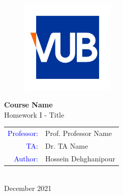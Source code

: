 \documentclass[12pt , a4paper]{article}
\newcommand{\courseName}{Course Name}
\newcommand{\assignmentName}{Homework I - Title}
\newcommand{\courseProfessor}{Prof. Professor Name}
\newcommand{\taName}{Dr. TA Name}
\newcommand{\documentAuthor}{Hossein Dehghanipour}
\newcommand{\writingMonth}{December 2021}
\begin{document}
%
%
\thispagestyle{empty}
 \begin{center}


\begin{figure}[H]
\centering
\includegraphics[width=0.4\textwidth]{VUB_Logo.jpg}
\caption*{}
\label{f-0-0}
\end{figure}
{
\centering
{}  
\fontsize{19pt}{19pt}
\selectfont 
\textbf{\courseName}
}
\\[20pt]
{
\centering
{}  
\fontsize{16pt}{16pt}
\selectfont 
\assignmentName
}
\\[20pt]
{
\centering
{}  
\fontsize{12pt}{12pt}
\selectfont 
\begin{tabular}{r l}
\textcolor{blue}{Professor:}			&	\courseProfessor\\[7pt]
\textcolor{blue}{TA:}				&	\taName\\[7pt]
\textcolor{blue}{Author:}			& \documentAuthor \\[7pt]

\end{tabular}
}
\\[20pt]
{
\centering
{}  
\fontsize{12pt}{12pt}
\selectfont 
\writingMonth
}

\end{center}
 

 
\setmainfont{Times New Roman}
\newpage

%
%
\tableofcontents
\newpage

%
%
\end{document}
